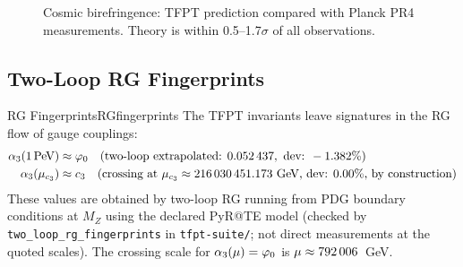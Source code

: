 \begin{figure}[H]
\centering
{}
\caption{Cosmic birefringence: TFPT prediction compared with Planck PR4 
measurements. Theory is within 0.5--1.7$\sigma$ of all observations.}
\label{fig:birefringence}
\end{figure}

\subsection{Two-Loop RG Fingerprints}

\begin{corollary}{RG Fingerprints}{RGfingerprints}
The TFPT invariants leave signatures in the RG flow of gauge couplings:
\begin{align}
    \alpha_3(1\,\text{PeV}) &\approx \phiz \quad 
        \text{(two-loop extrapolated: } \num[round-mode=places,round-precision=6]{\TFPTalphaThreePeVNum}, \text{ dev: } -\num[round-mode=places,round-precision=3]{\TFPTalphaThreePeVRelDevPercent}\%\text{)}\\
    \alpha_3(\mu_{\cthree}) &\approx \cthree \quad 
        \text{(crossing at } \mu_{\cthree}\approx \num[round-mode=places,round-precision=3]{\TFPTmuCrosscThreeGeV}\ \text{GeV, dev: } 0.00\%\text{, by construction)}
\end{align}
These values are obtained by two-loop RG running from PDG boundary conditions at $M_Z$ using the declared PyR@TE model (checked by \texttt{two\_loop\_rg\_fingerprints} in \texttt{tfpt-suite/}; not direct measurements at the quoted scales). The crossing scale for $\alpha_3(\mu)=\phiz$ is $\mu\approx \num[round-mode=places,round-precision=0]{\TFPTmuCrossVarphiZeroGeV}$~GeV.
\end{corollary}

